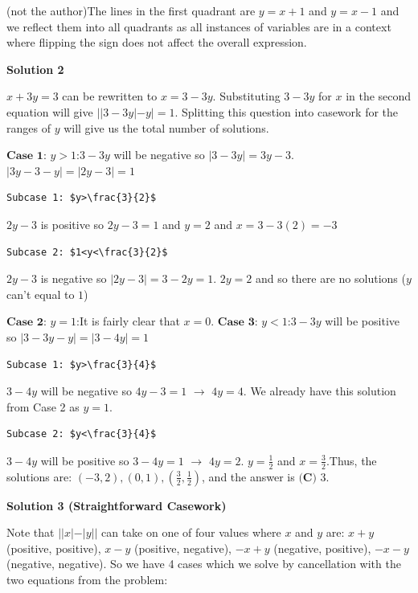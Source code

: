 \begin{enumerate}
 (not the author)The lines in the first quadrant are $y=x+1$ and $y=x-1$ and we reflect them into all quadrants as all instances of variables are in a context where flipping the sign does not affect the overall expression.

 



\textbf{Solution 2}

$x+3y=3$ can be rewritten to $x=3-3y$. Substituting $3-3y$ for $x$ in the second equation will give $||3-3y|-y|=1$. Splitting this question into casework for the ranges of $y$ will give us the total number of solutions. 

 $\textbf{Case 1:}$ $y>1$:$3-3y$ will be negative so $|3-3y| = 3y-3.$$|3y-3-y| = |2y-3| = 1$
\begin{verbatim}
Subcase 1: $y>\frac{3}{2}$
\end{verbatim}

$2y-3$ is positive so $2y-3 = 1$ and $y = 2$ and $x = 3-3(2) = -3$
\begin{verbatim}
Subcase 2: $1<y<\frac{3}{2}$
\end{verbatim}

$2y-3$ is negative so $|2y-3| = 3-2y = 1$. $2y = 2$ and so there are no solutions ($y$ can't equal to $1$)

 $\textbf{Case 2:}$ $y = 1$:It is fairly clear that $x = 0.$
$\textbf{Case 3:}$ $y<1$:$3-3y$ will be positive so $|3-3y-y| = |3-4y| = 1$
\begin{verbatim}
Subcase 1: $y>\frac{3}{4}$
\end{verbatim}

$3-4y$ will be negative so $4y-3 = 1$ $\rightarrow$ $4y = 4$. We already have this solution from Case 2 as $y = 1$.

 \begin{verbatim}
Subcase 2: $y<\frac{3}{4}$
\end{verbatim}

$3-4y$ will be positive so $3-4y = 1$ $\rightarrow$ $4y = 2$. $y = \frac{1}{2}$ and $x = \frac{3}{2}$.Thus, the solutions are: $(-3,2), (0,1), \left(\frac{3}{2},\frac{1}{2} \right)$, and the answer is $\boxed{\textbf{(C) } 3}$.

 



\textbf{Solution 3 (Straightforward Casework)}

Note that $||x| - |y||$ can take on one of four values where $x$ and $y$ are: $x + y$ (positive, positive), $x - y$ (positive, negative), $-x + y$ (negative, positive), $-x -y$ (negative, negative). So we have 4 cases which we solve by cancellation with the two equations from the problem:


\end{enumerate}
